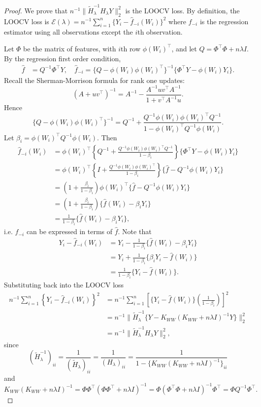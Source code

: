 \begin{proof}
We prove that $n^{-1}\|\tilde{H}_{\lambda}^{-1} H_{\lambda}Y\|_2^2$ is the LOOCV loss. By definition, the LOOCV loss is
$
\mathcal{E}(\lambda)=n^{-1}\sum_{i=1}^n \{Y_i-\hat{f}_{-i}(W_i)\}^2
$
where $\hat{f}_{-i}$ is the regression estimator using all observations except the $i$th observation.

Let $\Phi$ be the matrix of features, with $i$th row $\phi(W_i)^{\top}$, and let $Q=\Phi^{\top}\Phi+n\lambda I$. By the regression first order condition,
\begin{align*}
    \hat{f}&=Q^{-1}\Phi^{\top}Y,\quad 
    \hat{f}_{-i}=\{Q-\phi(W_i)\phi(W_i)^{\top}\}^{-1}\{\Phi^{\top}Y-\phi(W_i)Y_i\}.
\end{align*}
Recall the Sherman-Morrison formula for rank one updates:
$$
(A+uv^{\top})^{-1}=A^{-1}-\frac{A^{-1}uv^{\top} A^{-1}}{1+v^{\top}A^{-1}u}.
$$
Hence
$$
\{Q-\phi(W_i)\phi(W_i)^{\top}\}^{-1}=Q^{-1}+\frac{Q^{-1}\phi(W_i)\phi(W_i)^{\top}Q^{-1}}{1-\phi(W_i)^{\top}Q^{-1}\phi(W_i)}.
$$
Let $\beta_i=\phi(W_i)^{\top} Q^{-1} \phi(W_i)$. Then
\begin{align*}
    \hat{f}_{-i}(W_i)&=\phi(W_i)^{\top} \left\{Q^{-1}+\frac{Q^{-1}\phi(W_i)\phi(W_i)^{\top}Q^{-1}}{1-\beta_i}\right\}\{\Phi^{\top}Y-\phi(W_i)Y_i\} \\
    &=\phi(W_i)^{\top} \left\{I+\frac{Q^{-1}\phi(W_i)\phi(W_i)^{\top}}{1-\beta_i}\right\}\{\hat{f}-Q^{-1}\phi(W_i)Y_i\} \\
    &=\left(1 +\frac{\beta_i}{1-\beta_i}\right)\phi(W_i)^{\top}\{\hat{f}-Q^{-1}\phi(W_i)Y_i\}\\
    &=\left(1 +\frac{\beta_i}{1-\beta_i}\right)\{\hat{f}(W_i)-\beta_iY_i\} \\
    &=\frac{1}{1-\beta_i}\{\hat{f}(W_i)-\beta_iY_i\},
\end{align*}
i.e. $\hat{f}_{-i}$ can be expressed in terms of $\hat{f}$.
Note that
\begin{align*}
    Y_i-\hat{f}_{-i}(W_i)&=Y_i-\frac{1}{1-\beta_i}\{\hat{f}(W_i)-\beta_iY_i\} \\
    &=Y_i+\frac{1}{1-\beta_i}\{\beta_iY_i-\hat{f}(W_i)\} \\
    &=\frac{1}{1-\beta_i}\{Y_i-\hat{f}(W_i)\}.
\end{align*}
Substituting back into the LOOCV loss
\begin{align*}
    n^{-1}\sum_{i=1}^n \left\{Y_i-\hat{f}_{-i}(W_i)\right\}^2 
    &=n^{-1}\sum_{i=1}^n \left[\{Y_i-\hat{f}(W_i)\}\left(\frac{1}{1-\beta_i}\right)\right]^2 \\
    &= n^{-1}\|\tilde{H}_{\lambda}^{-1} \{Y-K_{WW}(K_{WW}+n\lambda  I )^{-1}Y\}\|_2^2 \\
    &=n^{-1}\|\tilde{H}_{\lambda}^{-1} H_{\lambda}Y\|_2^2,
\end{align*}
since
$$
(\tilde{H}_{\lambda}^{-1})_{ii}=\frac{1}{(\tilde{H}_{\lambda})_{ii}}=\frac{1}{(H_{\lambda})_{ii}}=\frac{1}{1-\{K_{WW}(K_{WW}+n\lambda  I )^{-1}\}_{ii}}
$$
and
$$
K_{WW}(K_{WW}+n\lambda  I )^{-1}=\Phi\Phi^{\top}(\Phi\Phi^{\top}+n\lambda  I )^{-1}=\Phi(\Phi^{\top}\Phi+n\lambda I)^{-1}\Phi^{\top}=\Phi Q^{-1}\Phi^{\top}.
$$
\end{proof}

